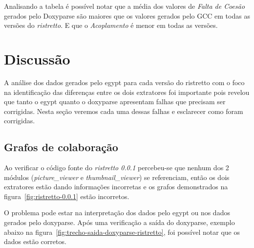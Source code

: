 Analisando a tabela é possível notar que a média dos valores de {\it Falta de
Coesão} gerados pelo Doxyparse são maiores que os valores gerados pelo GCC em
todas as versões do {\it ristretto}. E que o {\it Acoplamento} é menor em todas
as versões.

\section{Discussão} \label{sec:discussao}

A análise dos dados gerados pelo egypt para cada versão do ristretto com o foco
na identificação das diferenças entre os dois extratores foi importante pois
revelou que tanto o egypt quanto o doxyparse apresentam falhas que precisam ser
corrigidas. Nesta seção veremos cada uma dessas falhas e esclarecer como foram
corrigidas.

\subsection{Grafos de colaboração}

Ao verificar o código fonte do {\it ristretto 0.0.1} percebeu-se que nenhum dos
2 módulos ({\it picture\_viewer} e {\it thumbnail\_viewer}) se referenciam,
então os dois extratores estão dando informações incorretas e os grafos
demonstrados na figura~\ref{fig:ristretto-0.0.1} estão incorretos.

O problema pode estar na interpretação dos dados pelo egypt ou nos dados
gerados pelo doxyparse. Após uma verificação a saída do doxyparse, exemplo
abaixo na figura~\ref{fig:trecho-saida-doxyparse-ristretto}, foi possível notar
que os dados estão corretos.

